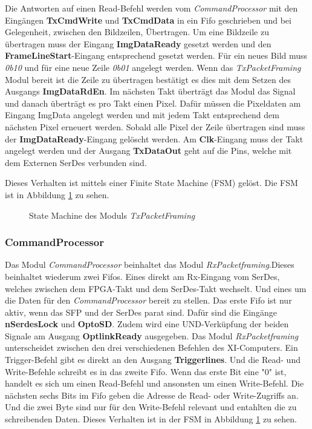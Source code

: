 \documentclass{article}
\begin{document}
Die Antworten auf einen Read-Befehl werden vom \textit{CommandProcessor} mit den Eingängen \textbf{TxCmdWrite} und \textbf{TxCmdData} in ein Fifo geschrieben und bei Gelegenheit, zwischen den Bildzeilen, Übertragen.
Um eine Bildzeile zu übertragen muss der Eingang \textbf{ImgDataReady} gesetzt werden und den \textbf{FrameLineStart}-Eingang entsprechend gesetzt werden. Für ein neues Bild muss \textit{0b10} und für eine neue Zeile \textit{0b01} angelegt werden. Wenn das \textit{TxPacketFraming} Modul bereit ist die Zeile zu übertragen bestätigt es dies mit dem Setzen des Ausgangs \textbf{ImgDataRdEn}. Im nächsten Takt überträgt das Modul das Signal und danach überträgt es pro Takt einen Pixel. Dafür müssen die Pixeldaten am Eingang {ImgData} angelegt werden und mit jedem Takt entsprechend dem nächsten Pixel erneuert werden. Sobald alle Pixel der Zeile übertragen sind muss der \textbf{ImgDataReady}-Eingang gelöscht werden. Am \textbf{Clk}-Eingang muss der Takt angelegt werden und der Ausgang \textbf{TxDataOut} geht auf die Pins, welche mit dem Externen SerDes verbunden sind.


Dieses Verhalten ist mittels einer Finite State Machine (FSM) gelöst. Die FSM ist in Abbildung \ref{fig:fsm_tx_packet_framing} zu sehen.

\begin{figure}[tb]
    \caption{State Machine des Moduls \textit{TxPacketFraming}}
    \label{fig:fsm_tx_packet_framing}
\end{figure}

\subsubsection*{CommandProcessor}
Das Modul \textit{CommandProcessor} beinhaltet das Modul \textit{RxPacketframing}.Dieses beinhaltet wiederum zwei Fifos. Eines direkt am Rx-Eingang vom SerDes, welches zwischen dem FPGA-Takt und dem SerDes-Takt wechselt. Und eines um die Daten für den \textit{CommandProcessor} bereit zu stellen. Das erste Fifo ist nur aktiv, wenn das SFP und der SerDes parat sind. Dafür sind die Eingänge \textbf{nSerdesLock} und \textbf{OptoSD}. Zudem wird eine UND-Verküpfung der beiden Signale am Ausgang \textbf{OptlinkReady} ausgegeben. Das Modul \textit{RxPacketframing} unterscheidet zwischen den drei verschiedenen Befehlen des XI-Computers. Ein Trigger-Befehl gibt es direkt an den Ausgang \textbf{Triggerlines}. Und die Read- und Write-Befehle schreibt es in das zweite Fifo. Wenn das erste Bit eine "0" ist, handelt es sich um einen Read-Befehl und ansonsten um einen Write-Befehl. Die nächsten sechs Bits im Fifo geben die Adresse de Read- oder Write-Zugriffs an. Und die zwei Byte sind nur für den Write-Befehl relevant und entahlten die zu schreibenden Daten. Dieses Verhalten ist in der FSM in Abbildung \ref{fig:fsm_tx_packet_framing} zu sehen.
\end{document}
